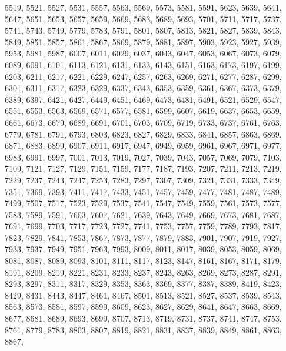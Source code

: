 \documentclass[landscape,twocolumn,a4paper]{article}
\begin{document}
 5519,  5521,  5527,  5531,  5557,  5563,  5569,  5573,  5581,  5591,  5623,  5639,  5641,  5647,
 5651,  5653,  5657,  5659,  5669,  5683,  5689,  5693,  5701,  5711,  5717,  5737,  5741,  5743,
 5749,  5779,  5783,  5791,  5801,  5807,  5813,  5821,  5827,  5839,  5843,  5849,  5851,  5857,
 5861,  5867,  5869,  5879,  5881,  5897,  5903,  5923,  5927,  5939,  5953,  5981,  5987,  6007,
 6011,  6029,  6037,  6043,  6047,  6053,  6067,  6073,  6079,  6089,  6091,  6101,  6113,  6121,
 6131,  6133,  6143,  6151,  6163,  6173,  6197,  6199,  6203,  6211,  6217,  6221,  6229,  6247,
 6257,  6263,  6269,  6271,  6277,  6287,  6299,  6301,  6311,  6317,  6323,  6329,  6337,  6343,
 6353,  6359,  6361,  6367,  6373,  6379,  6389,  6397,  6421,  6427,  6449,  6451,  6469,  6473,
 6481,  6491,  6521,  6529,  6547,  6551,  6553,  6563,  6569,  6571,  6577,  6581,  6599,  6607,
 6619,  6637,  6653,  6659,  6661,  6673,  6679,  6689,  6691,  6701,  6703,  6709,  6719,  6733,
 6737,  6761,  6763,  6779,  6781,  6791,  6793,  6803,  6823,  6827,  6829,  6833,  6841,  6857,
 6863,  6869,  6871,  6883,  6899,  6907,  6911,  6917,  6947,  6949,  6959,  6961,  6967,  6971,
 6977,  6983,  6991,  6997,  7001,  7013,  7019,  7027,  7039,  7043,  7057,  7069,  7079,  7103,
 7109,  7121,  7127,  7129,  7151,  7159,  7177,  7187,  7193,  7207,  7211,  7213,  7219,  7229,
 7237,  7243,  7247,  7253,  7283,  7297,  7307,  7309,  7321,  7331,  7333,  7349,  7351,  7369,
 7393,  7411,  7417,  7433,  7451,  7457,  7459,  7477,  7481,  7487,  7489,  7499,  7507,  7517,
 7523,  7529,  7537,  7541,  7547,  7549,  7559,  7561,  7573,  7577,  7583,  7589,  7591,  7603,
 7607,  7621,  7639,  7643,  7649,  7669,  7673,  7681,  7687,  7691,  7699,  7703,  7717,  7723,
 7727,  7741,  7753,  7757,  7759,  7789,  7793,  7817,  7823,  7829,  7841,  7853,  7867,  7873,
 7877,  7879,  7883,  7901,  7907,  7919,  7927,  7933,  7937,  7949,  7951,  7963,  7993,  8009,
 8011,  8017,  8039,  8053,  8059,  8069,  8081,  8087,  8089,  8093,  8101,  8111,  8117,  8123,
 8147,  8161,  8167,  8171,  8179,  8191,  8209,  8219,  8221,  8231,  8233,  8237,  8243,  8263,
 8269,  8273,  8287,  8291,  8293,  8297,  8311,  8317,  8329,  8353,  8363,  8369,  8377,  8387,
 8389,  8419,  8423,  8429,  8431,  8443,  8447,  8461,  8467,  8501,  8513,  8521,  8527,  8537,
 8539,  8543,  8563,  8573,  8581,  8597,  8599,  8609,  8623,  8627,  8629,  8641,  8647,  8663,
 8669,  8677,  8681,  8689,  8693,  8699,  8707,  8713,  8719,  8731,  8737,  8741,  8747,  8753,
 8761,  8779,  8783,  8803,  8807,  8819,  8821,  8831,  8837,  8839,  8849,  8861,  8863,  8867,
\end{document}
